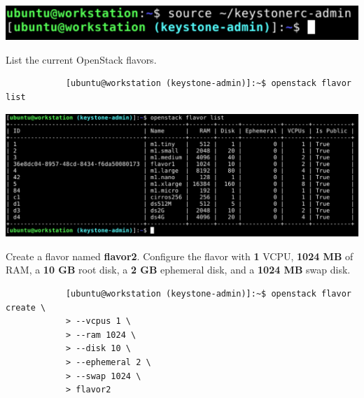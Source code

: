 \documentclass[letterpaper, 12pt]{article}
\begin{document}
\begin{enumerate}
\begin{labstep}
        \begin{center}
            \includegraphics[width=\linewidth]{images/part2/step6.png}
        \end{center}
    \end{labstep}

    \begin{labstep}
        List the current OpenStack flavors.
        \begin{lstlisting}
            [ubuntu@workstation (keystone-admin)]:~$ openstack flavor list
        \end{lstlisting}

        \begin{center}
            \includegraphics[width=\linewidth]{images/part2/step7.png}
        \end{center}
    \end{labstep}

    \begin{labstep}
        Create a flavor named \textbf{flavor2}.
        Configure the flavor with \textbf{1} VCPU, \textbf{1024 MB} of RAM, a \textbf{10 GB} root disk, a \textbf{2 GB} ephemeral disk, and a \textbf{1024 MB} swap disk.
        \begin{lstlisting}
            [ubuntu@workstation (keystone-admin)]:~$ openstack flavor create \
            > --vcpus 1 \
            > --ram 1024 \
            > --disk 10 \
            > --ephemeral 2 \
            > --swap 1024 \
            > flavor2
        \end{lstlisting}


\end{labstep}
\end{enumerate}
\end{document}
